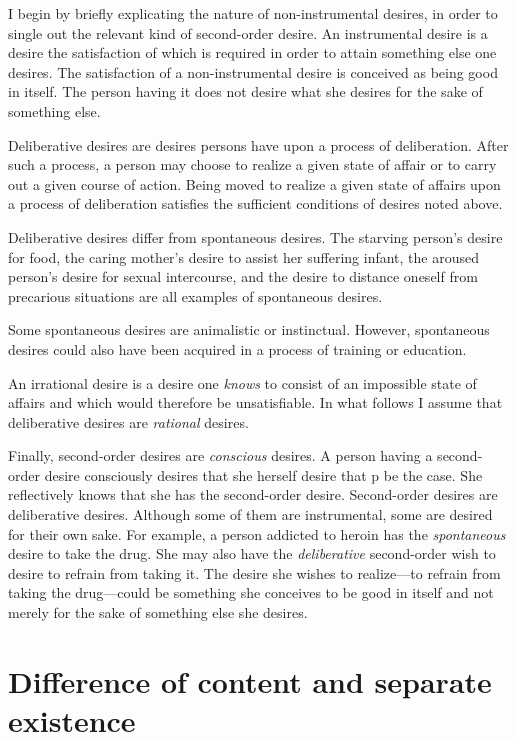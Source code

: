 \documentclass[output=paper,colorlinks,citecolor=brown
]{langscibook}
\begin{document}
I begin by briefly explicating the nature of non-instrumental desires, in order to single out the relevant kind of second-order desire. 
An instrumental desire is a desire the satisfaction of which is required in order to attain something else one desires. The satisfaction of a non-instrumental desire is conceived as being good in itself. The person having it does not desire what she desires for the sake of something else.

Deliberative desires are desires persons have upon a process of deliberation. After such a process, a person may choose to realize a given state of affair or to carry out a given course of action. Being moved to realize a given state of affairs upon a process of deliberation satisfies the sufficient conditions of desires noted above. 

Deliberative desires differ from spontaneous desires. The starving person's desire for food, the caring mother's desire to assist her suffering infant, the aroused person's desire for sexual intercourse, and the desire to distance oneself from precarious situations are all examples of spontaneous desires.

Some spontaneous desires are animalistic or instinctual. However, spontaneous desires could also have been acquired in a process of training or education. 

An irrational desire is a desire one \textit{knows} to consist of an impossible state of affairs and which would therefore be unsatisfiable. In what follows I assume that deliberative desires are \textit{rational} desires.

Finally, second-order desires are \textit{conscious} desires. A person having a second-order desire consciously desires that she herself desire that p be the case. She reflectively knows that she has the second-order desire. Second-order desires are deliberative desires. Although some of them are instrumental, some are desired for their own sake. For example, a person addicted to heroin has the \textit{spontaneous} desire to take the drug. She may also have the \textit{deliberative} second-order wish to desire to refrain from taking it. The desire she wishes to realize—to refrain from taking the drug—could be something she conceives to be good in itself and not merely for the sake of something else she desires.

\section{Difference of content and separate existence}
\end{document}
